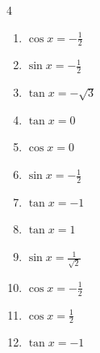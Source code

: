 \begin{multicols}{4}
\begin{enumerate}
  \item $\displaystyle \cos{x}  = -\frac{1}{2}$


  \item $\displaystyle \sin{x}  = -\frac{1}{2}$


  \item $\displaystyle \tan{x}  = -\sqrt{3}$


  \item $\displaystyle \tan{x}  = 0$


  \item $\displaystyle \cos{x}  = 0$


  \item $\displaystyle \sin{x}  = -\frac{1}{2}$


  \item $\displaystyle \tan{x}  = -1$


\columnbreak %

  \item $\displaystyle \tan{x}  = 1$


  \item $\displaystyle \sin{x}  = \frac{1}{\sqrt{2}}$


  \item $\displaystyle \cos{x}  = -\frac{1}{2}$


  \item $\displaystyle \cos{x}  = \frac{1}{2}$


  \item $\displaystyle \tan{x}  = -1$


\end{enumerate}
\end{multicols}
